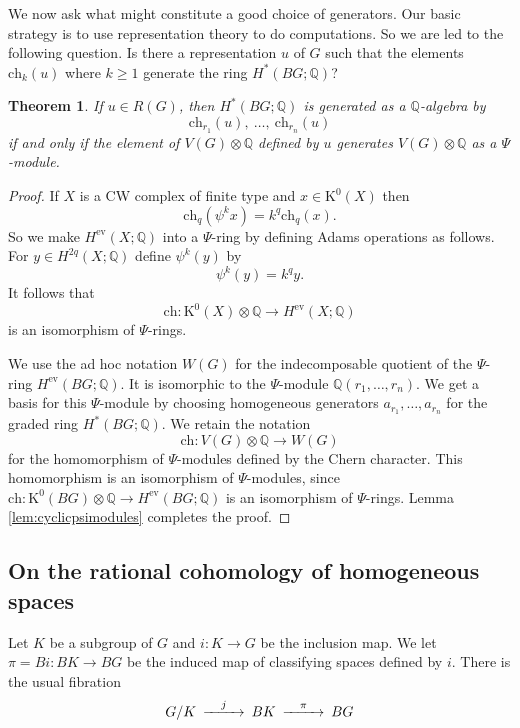 \documentclass[twoside,a4paper,reqno,11pt]{amsart}
\newtheorem{theorem}[lemma]{Theorem}
\newcommand{\K}{\mathrm{K}}
\newcommand{\Q}{\mathbb{Q}}
\renewcommand{\o}{\otimes}
\newcommand{\ch}{\mathrm{ch}}
\newcommand{\ev}{\mathrm{ev}}
\begin{document}
We now ask what might constitute a good choice of generators. Our basic strategy is to use representation theory to do computations. So we are led to the following question.  Is there a representation $u$ of $G$ such that the elements $\ch_k(u)$ where $k \geq 1$ generate the ring $H^*(BG; \Q)$?  

\begin{theorem} \label{thm:chernofminisenough}
If $u \in R(G)$, then $H^*(BG; \Q)$ is generated as a $\Q$-algebra by
$$
\ch_{r_1}(u), \ \dots , \ \ch_{r_n}(u)
$$
if and only if the element of $V(G)\o\Q$ defined by $u$ generates $V(G)\o\Q$ as a $\Psi$-module.
\end{theorem}

\begin{proof}
If $X$ is a CW complex of finite type and $x \in \K^0(X)$ then 
$$
\ch_q(\psi^kx) = k^q\ch_q(x).
$$
So we make $H^{\ev}(X ; \Q)$ into a $\Psi$-ring by defining Adams operations as follows.  For $y \in H^{2q}(X; \Q)$ define $\psi^k(y)$ by
$$
\psi^k(y) = k^qy.
$$
It follows that 
$$
\ch : \K^0(X) \o \Q \to H^{\ev}(X; \Q)
$$
is an isomorphism of $\Psi$-rings.

We use the ad hoc notation $W(G)$ for the indecomposable quotient of the $\Psi$-ring $H^{\ev}(BG; \Q)$.  It is isomorphic to the $\Psi$-module $\Q(r_1, \dots, r_n)$.  We get a basis for this $\Psi$-module by choosing homogeneous generators $a_{r_1},  \dots, a_{r_n}$ for the graded ring $H^*(BG; \Q)$.  We retain the notation 
$$
\ch : V(G) \o\Q \to W(G)
$$
for the homomorphism of $\Psi$-modules defined by the Chern character.  This homomorphism is an isomorphism of $\Psi$-modules, since $\ch : \K^0(BG) \o \Q \to H^{\ev}(BG; \Q)$ is an isomorphism of $\Psi$-rings. Lemma \ref{lem:cyclicpsimodules} completes the proof.
\end{proof}




\subsection{On the rational cohomology of homogeneous spaces}
Let $K$ be a subgroup of $G$ and $i:K \to G$ be the inclusion map. We let $\pi = Bi : BK \to BG$ be the induced map of classifying spaces defined by $i$. There is the usual fibration
\[
\begin{CD}
G/K @>j>> BK @>{\pi}>> BG
\end{CD}
\]
\end{document}
